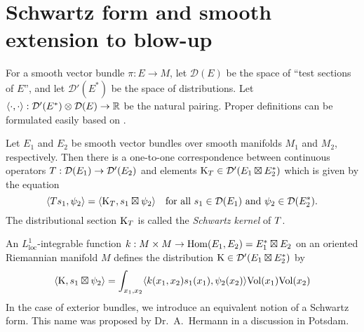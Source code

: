 \documentclass[\MainFolder/Text.tex]{subfiles}
\newcommand{\TestF}{\mathcal{D}}
\begin{document}
\section{Schwartz form and smooth extension to blow-up}\label{Sec:SchwFrom}

For a smooth vector bundle $\pi: E\rightarrow M$, let $\TestF(E)$ be the space of ``test sections of $E$'', and let $\TestF'(E^*)$ be the space of distributions.  Let $\langle\cdot,\cdot\rangle: \TestF'(E^*)\otimes\TestF(E)\rightarrow \R$ be the natural pairing. Proper definitions can be formulated easily based on \cite[Section~6]{HormanderI}.
\begin{Proposition}\label{Prop:SchwKer}
Let $E_1$ and $E_2$ be smooth vector bundles over smooth manifolds $M_1$ and $M_2$, respectively. Then there is a one-to-one correspondence between continuous operators $\TOp: \TestF(E_1)\rightarrow\TestF'(E_2)$ and elements $\KKer_\TOp\in\TestF'(E_1\boxtimes E_2^*)$ which is given by the equation
$$ \langle \TOp s_1, \psi_2 \rangle = \langle \KKer_\TOp, s_1 \boxtimes \psi_2 \rangle\quad\text{for all }s_1\in \TestF(E_1)\text{ and }\psi_2\in \TestF(E_2^*). $$
The distributional section $\mathrm{K}_{T}$ is called the \emph{Schwartz kernel} of $T$. 
\end{Proposition}

An $L^1_{\text{loc}}$-integrable function $k: M\times M \rightarrow \mathrm{Hom}(E_1,E_2)=E_1^*\boxtimes E_2$ on an oriented Riemannian manifold $M$ defines the distribution $\KKer\in \TestF'(E_1\boxtimes E_2^*)$ by
$$ \langle\mathrm{K},s_1\boxtimes \psi_2\rangle = \int_{x_1, x_2} \langle k(x_1,x_2)s_1(x_1),\psi_2(x_2)\rangle \mathrm{Vol}(x_1)\mathrm{Vol}(x_2) $$
In the case of exterior bundles, we introduce an equivalent notion of a Schwartz form. This name was proposed by Dr.~A.~Hermann in a discussion in Potsdam.
\end{document}
